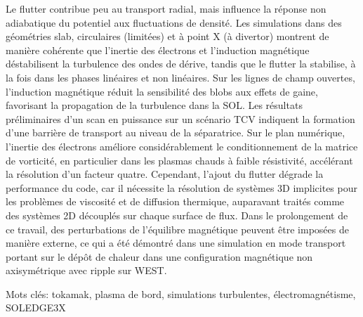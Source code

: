 Le flutter contribue peu au transport radial, mais influence la réponse non adiabatique du potentiel aux fluctuations de densité. Les simulations dans des géométries slab, circulaires (limitées) et à point X (à divertor) montrent de manière cohérente que l'inertie des électrons et l'induction magnétique déstabilisent la turbulence des ondes de dérive, tandis que le flutter la stabilise, à la fois dans les phases linéaires et non linéaires. Sur les lignes de champ ouvertes, l'induction magnétique réduit la sensibilité des blobs aux effets de gaine, favorisant la propagation de la turbulence dans la SOL. Les résultats préliminaires d'un scan en puissance sur un scénario TCV indiquent la formation d'une barrière de transport au niveau de la séparatrice. Sur le plan numérique, l'inertie des électrons améliore considérablement le conditionnement de la matrice de vorticité, en particulier dans les plasmas chauds à faible résistivité, accélérant la résolution d'un facteur quatre. Cependant, l'ajout du flutter dégrade la performance du code, car il nécessite la résolution de systèmes 3D implicites pour les problèmes de viscosité et de diffusion thermique, auparavant traités comme des systèmes 2D découplés sur chaque surface de flux. Dans le prolongement de ce travail, des perturbations de l'équilibre magnétique peuvent être imposées de manière externe, ce qui a été démontré dans une simulation en mode transport portant sur le dépôt de chaleur dans une configuration magnétique non axisymétrique avec ripple sur WEST.



\vspace{0.5cm}
Mots clés: tokamak, plasma de bord, simulations turbulentes, électromagnétisme, SOLEDGE3X



